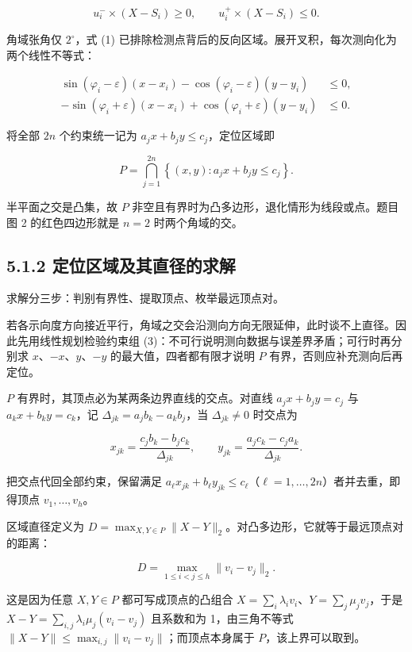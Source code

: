 \documentclass[UTF8,a4paper,zihao=-4,fontset=fandol]{ctexart}
\begin{document}
\[
u_i^-\times(X-S_i)\ge 0,\qquad u_i^+\times(X-S_i)\le 0. \tag{1}
\]

角域张角仅 $2^\circ$，式 (1) 已排除检测点背后的反向区域。展开叉积，每次测向化为两个线性不等式：

\[
\begin{aligned}
\sin(\varphi_i-\varepsilon)(x-x_i)-\cos(\varphi_i-\varepsilon)(y-y_i)&\le 0,\\
-\sin(\varphi_i+\varepsilon)(x-x_i)+\cos(\varphi_i+\varepsilon)(y-y_i)&\le 0.
\end{aligned}
\tag{2}
\]

将全部 $2n$ 个约束统一记为 $a_jx+b_jy\le c_j$，定位区域即

\[
P=\bigcap_{j=1}^{2n}\left\{(x,y):a_jx+b_jy\le c_j\right\}. \tag{3}
\]

半平面之交是凸集，故 $P$ 非空且有界时为凸多边形，退化情形为线段或点。题目图 2 的红色四边形就是 $n=2$ 时两个角域的交。

\subsection*{5.1.2 定位区域及其直径的求解}

求解分三步：判别有界性、提取顶点、枚举最远顶点对。

若各示向度方向接近平行，角域之交会沿测向方向无限延伸，此时谈不上直径。因此先用线性规划检验约束组 (3)：不可行说明测向数据与误差界矛盾；可行时再分别求 $x$、$-x$、$y$、$-y$ 的最大值，四者都有限才说明 $P$ 有界，否则应补充测向后再定位。

$P$ 有界时，其顶点必为某两条边界直线的交点。对直线 $a_jx+b_jy=c_j$ 与 $a_kx+b_ky=c_k$，记 $\Delta_{jk}=a_jb_k-a_kb_j$，当 $\Delta_{jk}\ne 0$ 时交点为

\[
x_{jk}=\frac{c_jb_k-b_jc_k}{\Delta_{jk}},\qquad
y_{jk}=\frac{a_jc_k-c_ja_k}{\Delta_{jk}}. \tag{4}
\]

把交点代回全部约束，保留满足 $a_\ell x_{jk}+b_\ell y_{jk}\le c_\ell$（$\ell=1,\dots,2n$）者并去重，即得顶点 $v_1,\dots,v_h$。

区域直径定义为 $D=\max_{X,Y\in P}\|X-Y\|_2$。对凸多边形，它就等于最远顶点对的距离：

\[
D=\max_{1\le i<j\le h}\|v_i-v_j\|_2 . \tag{5}
\]

这是因为任意 $X,Y\in P$ 都可写成顶点的凸组合 $X=\sum_i\lambda_iv_i$、$Y=\sum_j\mu_jv_j$，于是 $X-Y=\sum_{i,j}\lambda_i\mu_j(v_i-v_j)$ 且系数和为 1，由三角不等式 $\|X-Y\|\le\max_{i,j}\|v_i-v_j\|$；而顶点本身属于 $P$，该上界可以取到。
\end{document}
